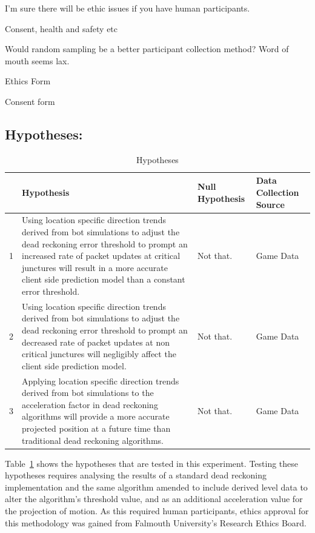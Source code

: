 \documentclass[journal]{IEEEtran}
\begin{document}
I'm sure there will be ethic issues if you have human participants.

Consent, health and safety etc

Would random sampling be a better participant collection method? Word of mouth seems lax.

Ethics Form

Consent form




\subsection{Hypotheses:} \label{hypothesis}
\begin{table}[h]
	\centering
	\caption{Hypotheses}
	\label{table:Hypothesis}
	\def\arraystretch{1.5}
	\begin{tabular}{|c|p{7cm}|p{7cm}|p{1.75cm}|}
		\hline
		& \textbf{Hypothesis}& \textbf{Null Hypothesis} & \textbf{Data Collection Source} \\ \hline
		1 & Using location specific direction trends derived from bot simulations to adjust the dead reckoning error threshold to prompt an increased rate of packet updates at critical junctures will result in a more accurate client side prediction model than a constant error threshold.
		& Not that.
		& Game Data \\ \hline
		2 & Using location specific direction trends derived from bot simulations to adjust the dead reckoning error threshold to prompt an decreased rate of packet updates at non critical junctures will negligibly affect the client side prediction model.
		& Not that.
		& Game Data \\ \hline
		3 & Applying location specific direction trends derived from bot simulations to the acceleration factor in dead reckoning algorithms will provide a more accurate projected position at a future time than traditional dead reckoning algorithms.
		& Not that.
		& Game Data \\ \hline
		
	\end{tabular}
\end{table}
Table~\ref{table:Hypothesis} shows the hypotheses that are tested in this experiment. Testing these hypotheses requires analysing the results of a standard dead reckoning implementation and the same algorithm amended to include derived level data to alter the algorithm's threshold value, and as an additional acceleration value for the projection of motion. As this required human participants, ethics approval for this methodology was gained from Falmouth University’s Research Ethics Board.
	








\end{document}
